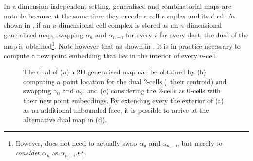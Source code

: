 In a dimension-independent setting, generalised and combinatorial maps are notable because at the same time they encode a cell complex and its dual.
As shown in , if an $n$-dimensional cell complex is stored as an $n$-dimensional generalised map, swapping $\alpha_n$ and $\alpha_{n-i}$ for every $i$ for every dart, the dual of the map is obtained\footnote{However, does not need to actually swap $\alpha_n$ and $\alpha_{n-i}$, but merely to \emph{consider} $\alpha_n$ as $\alpha_{n-i}$.}.
Note however that as shown in , it is in practice necessary to compute a new point embedding that lies in the interior of every $n$-cell.
\begin{figure}[tb]
\centering
{}
\quad
{}
\quad
{}
\quad
{}
\caption[A 2D generalised map and its dual]{The dual of (a) a 2D generalised map can be obtained by (b) computing a point location for the dual 2-cells (\eg\ their centroid) and swapping $\alpha_0$ and $\alpha_2$, and (c) considering the 2-cells as 0-cells with their new point embeddings.
By extending every the exterior of (a) as an additional unbounded face, it is possible to arrive at the alternative dual map in (d).}
\label{fig:dual_gmap}
\end{figure}

